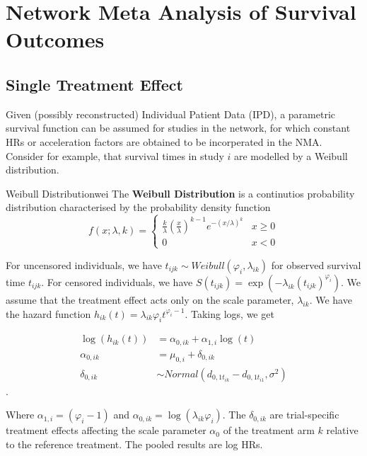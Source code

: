 \chapter{Network Meta Analysis of Survival Outcomes}

\section{Single Treatment Effect}

Given (possibly reconstructed) Individual Patient Data (IPD), a parametric survival function can be assumed for studies in the network, for which constant HRs or acceleration factors are obtained to be incorperated in the NMA. Consider for example, that survival times in study $i$ are modelled by a Weibull distribution.

\begin{definition}{Weibull Distribution}{wei}
     The \textbf{Weibull Distribution} is a continutios probability distribution characterised by the probability density function
     \[f(x; \lambda, k) = 
     \begin{cases}
          \frac{k}{\lambda} \left(\frac{x}{\lambda}\right) ^{k-1}e^{-(x/\lambda)^k} & x \geq 0 \\
          0 & x <0 
     \end{cases} 
     \]
\end{definition}

For uncensored individuals, we have $t_{ijk} \sim Weibull(\varphi_i, \lambda_{ik})$ for observed survival time $t_{ijk}$. For censored individuals, we have $S(t_{ijk}) = \exp(-\lambda_{ik}(t_{ijk})^{\varphi_i})$. We assume that the treatment effect acts only on the scale parameter, $\lambda_{ik}$. We have the hazard function $h_{ik}(t) = \lambda_{ik}\varphi_it^{\varphi_i-1}$. Taking logs, we get

\begin{align}
     \log(h_{ik}(t)) &= \alpha_{0,ik} + \alpha_{1,i}\log(t) \\
     \alpha_{0,ik} &= \mu_{0,i} + \delta_{0,ik} \label{eq:alpha0} \\
     \delta_{0,ik} &\sim Normal(d_{0,1t_{ik}}-d_{0,1t_{i1}}, \sigma^2) 
\end{align}.

Where $\alpha_{1,i} = (\varphi_i-1)$ and $\alpha_{0,ik} = \log(\lambda_{ik}\varphi_i)$. The $\delta_{0,ik}$ are trial-specific treatment effects affecting the scale parameter $\alpha_0$ of the treatment arm $k$ relative to the reference treatment. The pooled results are log HRs. 

